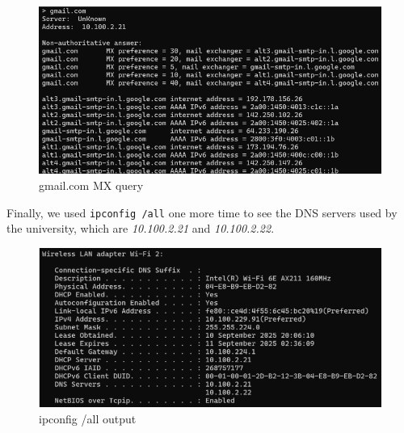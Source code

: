 \begin{figure}[htbp]
    \centering
    \includegraphics[width=1\linewidth]{img/12.png}
    \caption{gmail.com MX query}\label{fig:12}
\end{figure}

Finally, we used \texttt{ipconfig /all} one more time to see the DNS servers
used by the university, which are \textit{10.100.2.21} and
\textit{10.100.2.22}.

\begin{figure}[htbp]
    \centering
    \includegraphics[width=1\linewidth]{img/9.png}
    \caption{ipconfig /all output}\label{fig:9_repeated}
\end{figure}